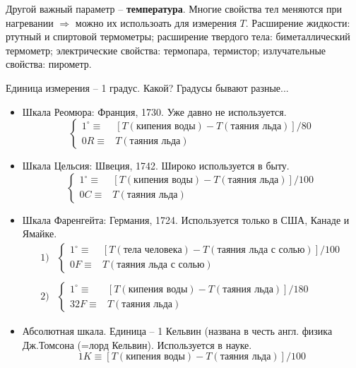 Другой важный параметр -- {\bf температура}. Многие свойства тел ме\-ня\-ют\-ся при нагревании $\Rightarrow$ можно их использоать для измерения $T$. Рас\-ши\-ре\-ние жидкости: ртутный и спиртовой термометры; расширение твер\-до\-го тела: биметаллический термометр; электрические свойства: термо\-пара, термистор; излучательные свойства: пирометр.

Единица измерения -- 1 градус. Какой? Градусы бывают разные...
\begin{itemize}
\item Шкала Реомюра: Франция, 1730. Уже давно не используется.
 \begin{displaymath}
 \left\{
 \begin{array}{cl}
 1^\circ\equiv & \left[T(\texttt{кипения воды})-T(\texttt{таяния льда})\right]/80\\
 0R\equiv &T(\texttt{таяния льда})
 \end{array}
 \right.
 \end{displaymath}
\item Шкала Цельсия: Швеция, 1742. Широко используется в быту.
 \begin{displaymath}
 \left\{
 \begin{array}{cl}
 1^\circ\equiv & \left[T(\texttt{кипения воды})-T(\texttt{таяния льда})\right]/100\\
 0C\equiv &T(\texttt{таяния льда})
 \end{array}
 \right.
 \end{displaymath}
\item Шкала Фаренгейта: Германия, 1724. Используется только в США, Канаде и Ямайке.
 \begin{displaymath}
 \begin{array}{rl}
 1) &
 \left\{
 \begin{array}{cl}
 1^\circ\equiv & \left[T(\texttt{тела человека})-T(\texttt{таяния льда с солью})\right]/100\\
 0F\equiv &T(\texttt{таяния льда с солью})
 \end{array}
 \right.
 \\ \\
 2) &
 \left\{
 \begin{array}{cl}
 1^\circ\equiv & \left[T(\texttt{кипения воды})-T(\texttt{таяния льда})\right]/180\\
 32F\equiv &T(\texttt{таяния льда})
 \end{array}
 \right.
 \end{array}
 \end{displaymath}
\item Абсолютная шкала. Единица -- 1 Кельвин (названа в честь англ. физика Дж.Томсона (=лорд Кельвин). Используется в науке.
 \begin{displaymath}
 1K\equiv \left[T(\texttt{кипения воды})-T(\texttt{таяния льда})\right]/100
 \end{displaymath}
\end{itemize}
